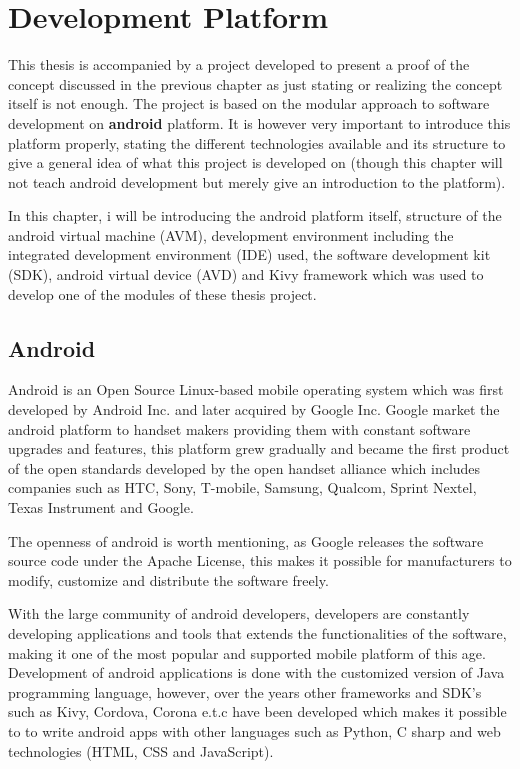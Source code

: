 \chapter{Development Platform}
This thesis is accompanied by a project developed to present a proof of the concept discussed in the previous chapter as just stating or realizing the concept itself is not enough. The project is based on the modular approach to software development on {\bf android} platform. It is however very important to introduce this platform properly, stating the different technologies available and its structure to give a general idea of what this project is developed on (though this chapter will not teach android development but merely give an introduction to the platform). 

In this chapter, i will be introducing the android platform itself, structure of the android virtual machine (AVM), development environment including the integrated development environment (IDE) used, the software development kit (SDK), android virtual device (AVD) and Kivy framework which was used to develop one of the modules of these thesis project. 

\section{Android}
Android is an Open Source Linux-based mobile operating system which was first developed by Android Inc. and later acquired by Google Inc. Google market the android platform to handset makers providing them with constant software upgrades and features, this platform grew gradually and became the first product of the open standards developed by the open handset alliance which includes companies such as HTC, Sony, T-mobile, Samsung, Qualcom, Sprint Nextel, Texas Instrument and Google.

The openness of android is worth mentioning, as Google releases the software source code under the Apache License, this makes it possible for manufacturers to modify, customize and distribute the software freely. 

With the large community of android developers, developers are constantly developing applications and tools that extends the functionalities of the software, making it one of the most popular and supported mobile platform of this age. Development of android applications is done with the customized version of Java programming language, however, over the years other frameworks and SDK's such as Kivy, Cordova, Corona e.t.c have been developed which makes it possible to to write android apps with other languages such as Python, C sharp and web technologies (HTML, CSS and JavaScript).


